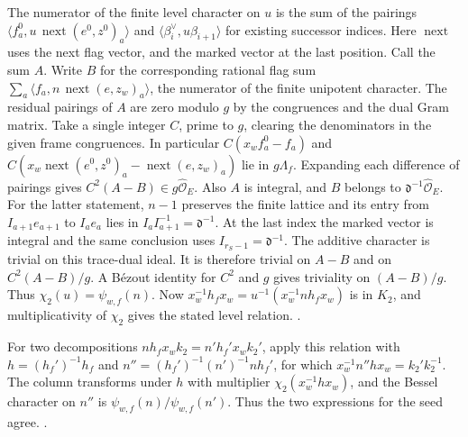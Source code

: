 The numerator of the finite level character on \(u\)
is the sum of the pairings
\(\langle f^0_a,u\,\operatorname{next}(e^0,z^0)_a\rangle\)
and \(\langle\beta_i^\vee,u\beta_{i+1}\rangle\) for existing
successor indices. Here \(\operatorname{next}\) uses the next
flag vector, and the marked vector at the last position.
Call the sum \(A\). Write \(B\) for the corresponding rational
flag sum \(\sum_a\langle f_a,n\,\operatorname{next}(e,z_w)_a\rangle\),
the numerator of the finite unipotent character. The residual
pairings of \(A\) are zero modulo \(g\) by the congruences and
the dual Gram matrix. Take a single integer \(C\), prime to \(g\),
clearing the denominators in the given frame congruences.
In particular \(C(x_wf^0_a-f_a)\) and
\(C(x_w\operatorname{next}(e^0,z^0)_a-
                  \operatorname{next}(e,z_w)_a)\) lie in \(g\Lambda_f\).
Expanding each difference of pairings gives
\(C^2(A-B)\in g\widehat{\mathcal O}_E\).
Also \(A\) is integral, and \(B\) belongs to
\(\mathfrak d^{-1}\widehat{\mathcal O}_E\).
For the latter statement, \(n-1\) preserves the finite
lattice and its entry from \(I_{a+1}e_{a+1}\) to \(I_ae_a\)
lies in \(I_aI_{a+1}^{-1}=\mathfrak d^{-1}\). At the last
index the marked vector is integral and the same conclusion
uses \(I_{r_S-1}=\mathfrak d^{-1}\).
The additive character is trivial on this trace-dual ideal.
It is therefore trivial on \(A-B\) and on \(C^2(A-B)/g\).
A B\'ezout identity for \(C^2\) and \(g\) gives triviality on
\((A-B)/g\). Thus \(\chi_2(u)=\psi_{w,f}(n)\).
Now \(x_w^{-1}h_fx_w=u^{-1}(x_w^{-1}nh_fx_w)\) is in \(K_2\),
and multiplicativity of \(\chi_2\) gives the stated level relation.
.

For two decompositions \(n h_f x_w k_2=n' h_f' x_w k_2'\), apply
this relation with \(h=(h_f')^{-1}h_f\) and
\(n''=(h_f')^{-1}(n')^{-1}n h_f'\), for which
\(x_w^{-1}n''h x_w=k_2'k_2^{-1}\). The column transforms
under \(h\) with multiplier \(\chi_2(x_w^{-1}h x_w)\),
and the Bessel character on \(n''\) is
\(\psi_{w,f}(n)/\psi_{w,f}(n')\).
Thus the two expressions for the seed agree.
.

